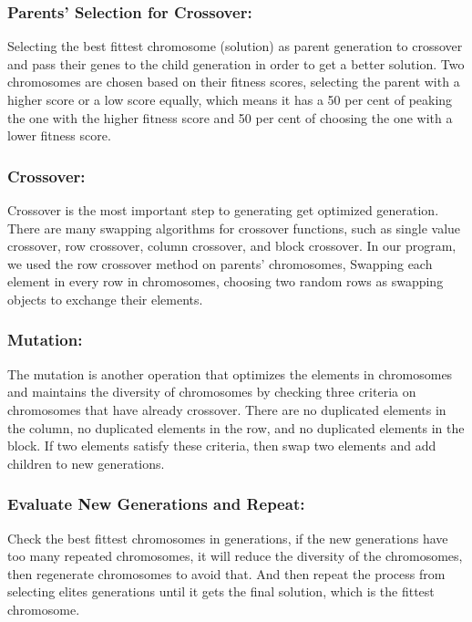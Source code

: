 \subsubsection{Parents' Selection for Crossover:}
Selecting the best fittest chromosome (solution) as parent generation to crossover and pass their genes to the child generation in order to get a better solution. Two chromosomes are chosen based on their fitness scores, selecting the parent with a higher score or a low score equally, which means it has a 50 per cent of peaking the one with the higher fitness score and 50 per cent of choosing the one with a lower fitness score.

\subsubsection{Crossover:} 
Crossover is the most important step to generating get optimized generation. There are many swapping algorithms for crossover functions, such as single value crossover, row crossover, column crossover, and block crossover. In our program, we used the row crossover method on parents' chromosomes,  Swapping each element in every row in chromosomes, choosing two random rows as swapping objects to exchange their elements.

\subsubsection{Mutation:}
The mutation is another operation that optimizes the elements in chromosomes and maintains the diversity of chromosomes by checking three criteria on chromosomes that have already crossover. There are no duplicated elements in the column, no duplicated elements in the row, and no duplicated elements in the block. If two elements satisfy these criteria, then swap two elements and add children to new generations.

\subsubsection{Evaluate New Generations and Repeat:}
Check the best fittest chromosomes in generations, if the new generations have too many repeated chromosomes, it will reduce the diversity of the chromosomes, then regenerate chromosomes to avoid that. And then repeat the process from selecting elites generations until it gets the final solution, which is the fittest chromosome.
